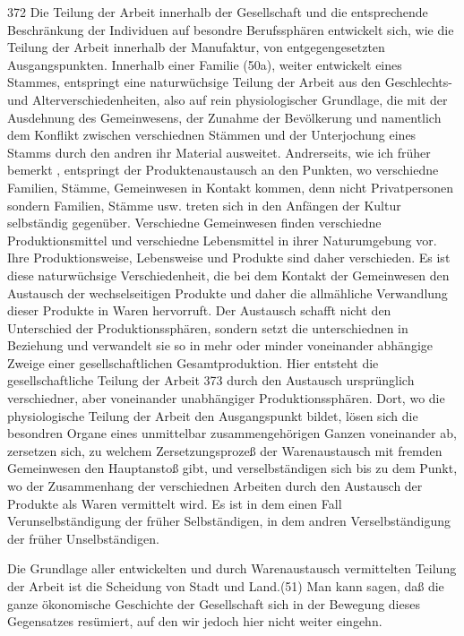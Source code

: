 {\num{372} Die Teilung der Arbeit innerhalb der
Gesellschaft und die entsprechende Beschränkung der Individuen auf
besondre Berufssphären entwickelt sich, wie die Teilung der Arbeit
innerhalb der Manufaktur, von entgegengesetzten Ausgangspunkten.
Innerhalb einer Familie (50a), weiter entwickelt eines Stammes,
entspringt eine naturwüchsige Teilung der Arbeit aus den Geschlechts-
und Alterverschiedenheiten, also auf rein physiologischer Grundlage, die
mit der Ausdehnung des Gemeinwesens, der Zunahme der Bevölkerung und
namentlich dem Konflikt zwischen verschiednen Stämmen und der
Unterjochung eines Stamms durch den andren ihr Material ausweitet.
Andrerseits, wie ich früher bemerkt , entspringt der Produktenaustausch
an den Punkten, wo verschiedne Familien, Stämme, Gemeinwesen in Kontakt
kommen, denn nicht Privatpersonen sondern Familien, Stämme usw. treten
sich in den Anfängen der Kultur selbständig gegenüber. Verschiedne
Gemeinwesen finden verschiedne Produktionsmittel und verschiedne
Lebensmittel in ihrer Naturumgebung vor. Ihre Produktionsweise,
Lebensweise und Produkte sind daher verschieden. Es ist diese
naturwüchsige Verschiedenheit, die bei dem Kontakt der Gemeinwesen den
Austausch der wechselseitigen Produkte und daher die allmähliche
Verwandlung dieser Produkte in Waren hervorruft. Der Austausch schafft
nicht den Unterschied der Produktionssphären, sondern setzt die
unterschiednen in Beziehung und verwandelt sie so in mehr oder minder
voneinander abhängige Zweige einer gesellschaftlichen Gesamtproduktion.
Hier entsteht die gesellschaftliche Teilung der Arbeit
\num{373} durch den Austausch ursprünglich
verschiedner, aber voneinander unabhängiger Produktionssphären. Dort, wo
die physiologische Teilung der Arbeit den Ausgangspunkt bildet, lösen
sich die besondren Organe eines unmittelbar zusammengehörigen Ganzen
voneinander ab, zersetzen sich, zu welchem Zersetzungsprozeß der
Warenaustausch mit fremden Gemeinwesen den Hauptanstoß gibt, und
verselbständigen sich bis zu dem Punkt, wo der Zusammenhang der
verschiednen Arbeiten durch den Austausch der Produkte als Waren
vermittelt wird. Es ist in dem einen Fall Verunselbständigung der früher
Selbständigen, in dem andren Verselbständigung der früher
Unselbständigen.

Die Grundlage aller entwickelten und durch Warenaustausch vermittelten
Teilung der Arbeit ist die Scheidung von Stadt und Land.(51) Man kann
sagen, daß die ganze ökonomische Geschichte der Gesellschaft sich in der
Bewegung dieses Gegensatzes resümiert, auf den wir jedoch hier nicht
weiter eingehn.

}
